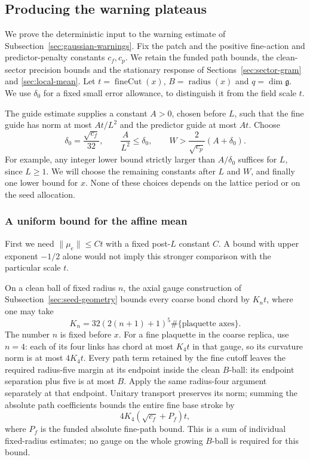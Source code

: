 \subsection{Producing the warning plateaus}
\label{sec:warning-safety}
We prove the deterministic input to the warning estimate of
Subsection~\ref{sec:gaussian-warnings}. Fix the patch and the positive
fine-action and predictor-penalty constants $c_f,c_p$. We retain the
funded path bounds, the clean-sector precision bounds and the stationary
response of Sections~\ref{sec:sector-gram} and \ref{sec:local-mean}.
Let $t=\operatorname{fineCut}(x)$, $B=\operatorname{radius}(x)$ and
$q=\dim\mathfrak g$. We use $\delta_0$ for a fixed small error allowance,
to distinguish it from the field scale $t$.

The guide estimate supplies a constant $A>0$, chosen before $L$, such
that the fine guide has norm at most $At/L^2$ and the predictor guide
at most $At$. Choose
\begin{equation}\label{eq:safety-goals}
 \delta_0=\frac{\sqrt{c_f}}{32},\qquad
 \frac{A}{L^2}\le\delta_0,\qquad
 W>\frac{2}{\sqrt{c_p}}(A+\delta_0).
\end{equation}
For example, any integer lower bound strictly larger than $A/\delta_0$
suffices for $L$, since $L\ge1$. We will choose the remaining constants
after $L$ and $W$, and finally one lower bound for $x$. None of these
choices depends on the lattice period or on the seed allocation.

\subsubsection{A uniform bound for the affine mean}
First we need $\|\mu_e\|\le C t$ with a fixed post-$L$ constant $C$.
A bound with upper exponent $-1/2$ alone would not imply this stronger
comparison with the particular scale $t$.

On a clean ball of fixed radius $n$, the axial gauge construction of
Subsection~\ref{sec:seed-geometry} bounds every coarse bond chord by
$K_n t$, where one may take
\[
                  K_n=32(2(n+1)+1)^5\#\{\text{plaquette axes}\}.
\]
The number $n$ is fixed before $x$. For a fine plaquette in the coarse
replica, use $n=4$: each of its four links has chord at most $K_4t$
in that gauge, so its curvature norm is at most $4K_4t$. Every path
term retained by the fine cutoff leaves the required radius-five margin at its endpoint inside the clean
$B$-ball: its endpoint separation plus five is at most $B$. Apply the same radius-four argument separately at that
endpoint. Unitary transport preserves its norm; summing the absolute
path coefficients bounds the entire fine base stroke by
\[
                 4K_4(\sqrt{c_f}+P_f)t,
\]
where $P_f$ is the funded absolute fine-path bound. This is a sum of
individual fixed-radius estimates; no gauge on the whole growing
$B$-ball is required for this bound.

